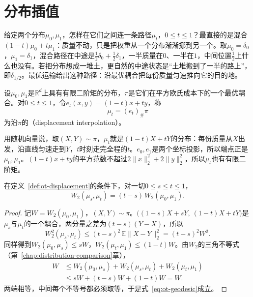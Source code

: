 \section{分布插值}
\label{sec:ot-interpolation}

给定两个分布$\mu_0,\mu_1$，怎样在它们之间连一条路径$\mu_t$，$0\leq t\leq1$？最直接的是混合$(1-t)\mu_0+t\mu_1$：质量不动，只是把权重从一个分布渐渐挪到另一个。取$\mu_0=\delta_0$，$\mu_1=\delta_1$，混合路径在中途是$\tfrac12\delta_0+\tfrac12\delta_1$，一半质量在$0$、一半在$1$，中间位置$\tfrac12$上什么也没有。若把分布想成一堆土，更自然的中途状态是“土堆搬到了一半的路上”，即$\delta_{1/2}$。最优运输给出这种路径：沿最优耦合把每份质量匀速推向它的目的地。

\begin{definition}[位移插值]
\label{def:ot-displacement}
设$\mu_0,\mu_1$是$\mathbb{R}^{d}$上具有有限二阶矩的分布，$\pi$是它们在平方欧氏成本下的一个最优耦合。对$0\leq t\leq1$，令$e_t(x,y)=(1-t)x+ty$，称
\begin{equation}
 \mu_t=(e_t)_\#\pi
 \label{eq:ot-displacement}
\end{equation}
为沿$\pi$的（displacement interpolation）。
\end{definition}

用随机向量说，取$(X,Y)\sim\pi$，$\mu_t$就是$(1-t)X+tY$的分布：每份质量从$X$出发，沿直线匀速走到$Y$，$t$时刻走完全程的$t$。$e_0,e_1$是两个坐标投影，所以端点正是$\mu_0,\mu_1$。$(1-t)x+ty$的平方范数不超过$2\lVert x\rVert_2^{2}+2\lVert y\rVert_2^{2}$，所以$\mu_t$也有有限二阶矩。

\begin{theorem}[位移插值是常速测地线]
\label{thm:ot-geodesic}
在定义~\ref{def:ot-displacement}的条件下，对一切$0\leq s\leq t\leq1$，
\begin{equation}
 W_2(\mu_s,\mu_t)=(t-s)\,W_2(\mu_0,\mu_1).
 \label{eq:ot-geodesic}
\end{equation}
\end{theorem}

\begin{proof}
记$W=W_2(\mu_0,\mu_1)$，$(X,Y)\sim\pi$。$\bigl((1-s)X+sY,\ (1-t)X+tY\bigr)$是$\mu_s$与$\mu_t$的一个耦合，两分量之差为$(t-s)(Y-X)$，所以
\[
 W_2^{2}(\mu_s,\mu_t)\leq(t-s)^{2}\,\mathbb{E}\lVert X-Y\rVert_2^{2}=(t-s)^{2}W^{2} .
\]
同样得到$W_2(\mu_0,\mu_s)\leq sW$，$W_2(\mu_t,\mu_1)\leq(1-t)W$。由$W_2$的三角不等式（第~\ref{chap:distribution-comparison}章），
\[
 \begin{aligned}
 W&\leq W_2(\mu_0,\mu_s)+W_2(\mu_s,\mu_t)+W_2(\mu_t,\mu_1)\\
 &\leq sW+(t-s)W+(1-t)W=W .
 \end{aligned}
\]
两端相等，中间每个不等号都必须取等，于是式~\eqref{eq:ot-geodesic}成立。
\end{proof}

